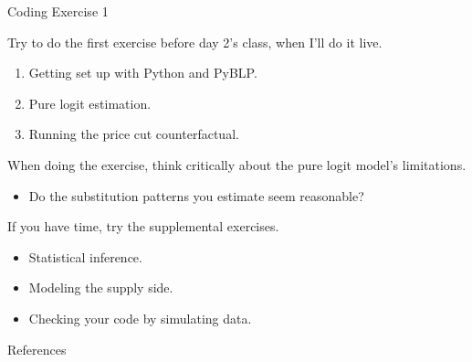 \documentclass[aspectratio=169,t,11pt,table]{beamer}
\begin{document}
\begin{frame}{Coding Exercise 1}
    \begin{wideitemize}
        \item Try to do the first exercise before day 2's class, when I'll do it live.
        \begin{enumerate}
            \item Getting set up with Python and PyBLP.
            \item Pure logit estimation.
            \item Running the price cut counterfactual.
        \end{enumerate}
        \pause
        \item When doing the exercise, think critically about the pure logit model's limitations.
        \begin{itemize}
            \item Do the substitution patterns you estimate seem reasonable?
        \end{itemize}
        \pause
        \item If you have time, try the supplemental exercises.
        \begin{itemize}
            \item Statistical inference.
            \item Modeling the supply side.
            \item Checking your code by simulating data.
        \end{itemize}
    \end{wideitemize}
\end{frame}

\backupbegin

\begin{frame}{References}
    
\end{frame}

\backupend
\end{document}
